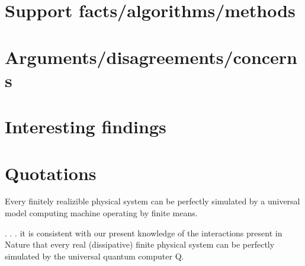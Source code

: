 \documentclass{article}
\begin{document}
\section{Support facts/algorithms/methods}


\section{Arguments/disagreements/concerns}


\section{Interesting findings}


\section{Quotations}
Every finitely realizible physical system can be perfectly simulated by a universal model computing machine operating by finite means.

. . . it is consistent with our present knowledge of the interactions present in Nature that every real (dissipative) finite physical system can be perfectly simulated by the universal quantum computer Q.
\end{document}
